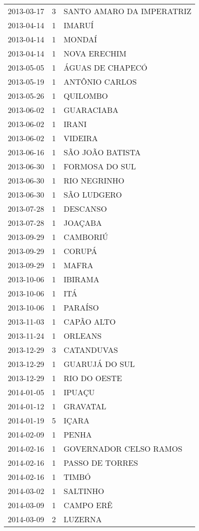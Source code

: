 \begin{longtable}[htbp]{ccl}
2013-03-17 & 3 & SANTO AMARO DA IMPERATRIZ \\
2013-04-14 & 1 & IMARUÍ \\
2013-04-14 & 1 & MONDAÍ \\
2013-04-14 & 1 & NOVA ERECHIM \\
2013-05-05 & 1 & ÁGUAS DE CHAPECÓ \\
2013-05-19 & 1 & ANTÔNIO CARLOS \\
2013-05-26 & 1 & QUILOMBO \\
2013-06-02 & 1 & GUARACIABA \\
2013-06-02 & 1 & IRANI \\
2013-06-02 & 1 & VIDEIRA \\
2013-06-16 & 1 & SÃO JOÃO BATISTA \\
2013-06-30 & 1 & FORMOSA DO SUL \\
2013-06-30 & 1 & RIO NEGRINHO \\
2013-06-30 & 1 & SÃO LUDGERO \\
2013-07-28 & 1 & DESCANSO \\
2013-07-28 & 1 & JOAÇABA \\
2013-09-29 & 1 & CAMBORIÚ \\
2013-09-29 & 1 & CORUPÁ \\
2013-09-29 & 1 & MAFRA \\
2013-10-06 & 1 & IBIRAMA \\
2013-10-06 & 1 & ITÁ \\
2013-10-06 & 1 & PARAÍSO \\
2013-11-03 & 1 & CAPÃO ALTO \\
2013-11-24 & 1 & ORLEANS \\
2013-12-29 & 3 & CATANDUVAS \\
2013-12-29 & 1 & GUARUJÁ DO SUL \\
2013-12-29 & 1 & RIO DO OESTE \\
2014-01-05 & 1 & IPUAÇU \\
2014-01-12 & 1 & GRAVATAL \\
2014-01-19 & 5 & IÇARA \\
2014-02-09 & 1 & PENHA \\
2014-02-16 & 1 & GOVERNADOR CELSO RAMOS \\
2014-02-16 & 1 & PASSO DE TORRES \\
2014-02-16 & 1 & TIMBÓ \\
2014-03-02 & 1 & SALTINHO \\
2014-03-09 & 1 & CAMPO ERÊ \\
2014-03-09 & 2 & LUZERNA \\

\end{longtable}
